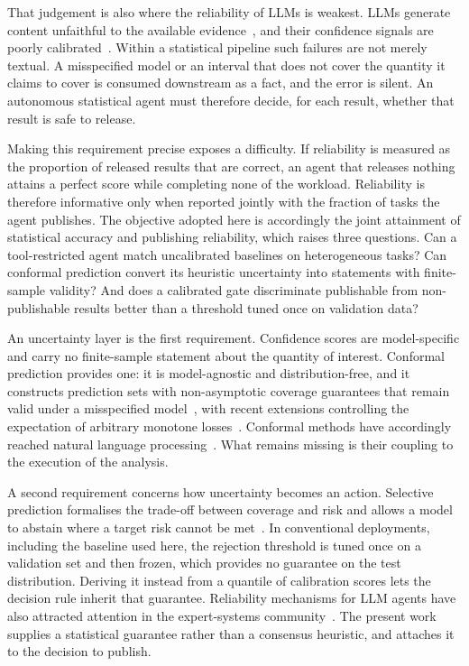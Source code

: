 \documentclass[preprint,12pt,authoryear]{elsarticle}
\begin{document}
That judgement is also where the reliability of LLMs is weakest. LLMs generate content unfaithful to the available evidence~\citep{ji2023survey}, and their confidence signals are poorly calibrated~\citep{guo2017calibration,kadavath2022language}. Within a statistical pipeline such failures are not merely textual. A misspecified model or an interval that does not cover the quantity it claims to cover is consumed downstream as a fact, and the error is silent. An autonomous statistical agent must therefore decide, for each result, whether that result is safe to release.

Making this requirement precise exposes a difficulty. If reliability is measured as the proportion of released results that are correct, an agent that releases nothing attains a perfect score while completing none of the workload. Reliability is therefore informative only when reported jointly with the fraction of tasks the agent publishes. The objective adopted here is accordingly the joint attainment of statistical accuracy and publishing reliability, which raises three questions. Can a tool-restricted agent match uncalibrated baselines on heterogeneous tasks? Can conformal prediction convert its heuristic uncertainty into statements with finite-sample validity? And does a calibrated gate discriminate publishable from non-publishable results better than a threshold tuned once on validation data?

An uncertainty layer is the first requirement. Confidence scores are model-specific and carry no finite-sample statement about the quantity of interest. Conformal prediction provides one: it is model-agnostic and distribution-free, and it constructs prediction sets with non-asymptotic coverage guarantees that remain valid under a misspecified model~\citep{lei2018distribution,angelopoulos2023gentle}, with recent extensions controlling the expectation of arbitrary monotone losses~\citep{angelopoulos2024conformal}. Conformal methods have accordingly reached natural language processing~\citep{campos2024conformal,wang2024conu,cherian2024large}. What remains missing is their coupling to the execution of the analysis.

A second requirement concerns how uncertainty becomes an action. Selective prediction formalises the trade-off between coverage and risk and allows a model to abstain where a target risk cannot be met~\citep{geifman2017selective}. In conventional deployments, including the baseline used here, the rejection threshold is tuned once on a validation set and then frozen, which provides no guarantee on the test distribution. Deriving it instead from a quantile of calibration scores lets the decision rule inherit that guarantee. Reliability mechanisms for LLM agents have also attracted attention in the expert-systems community~\citep{shi2025mitigating,he2026enhancing}. The present work supplies a statistical guarantee rather than a consensus heuristic, and attaches it to the decision to publish.
\end{document}
